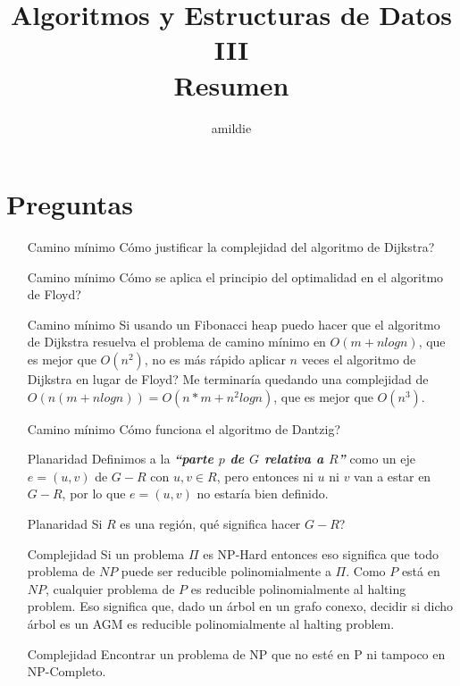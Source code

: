 \documentclass[10pt, a4paper]{article}
\title{Algoritmos y Estructuras de Datos III\\Resumen}
\author{amildie}
\date{\vspace{-5ex}}
\begin{document}
\renewcommand*\contentsname{\empty}

\maketitle
\tableofcontents















\newpage
\section{Preguntas}
\begin{enumerate}
\item [Camino m\'inimo] C\'omo justificar la complejidad del algoritmo de Dijkstra?
\item [Camino m\'inimo] C\'omo se aplica el principio del optimalidad en el algoritmo de Floyd?
\item [Camino m\'inimo] Si usando un Fibonacci heap puedo hacer que el algoritmo de Dijkstra resuelva el problema de camino m\'inimo en $O(m + n log n)$, que es mejor que $O(n^2)$, no es m\'as r\'apido aplicar $n$ veces el algoritmo de Dijkstra en lugar de Floyd? Me terminar\'ia quedando una complejidad de $O(n(m + n log n)) = $$O(n*m + n^2 log n)$, que es mejor que $O(n^3)$.
\item [Camino m\'inimo] C\'omo funciona el algoritmo de Dantzig?
\item [Planaridad] Definimos a la \textbf{\emph{``parte $p$ de $G$ relativa a $R$''}} como un eje $e = (u, v)$ de $G - R$ con $u,v \in R$, pero entonces ni $u$ ni $v$ van a estar en $G - R$, por lo que $e = (u, v)$ no estar\'ia bien definido.
\item [Planaridad] Si $R$ es una regi\'on, qu\'e significa hacer $G - R$?
\item [Complejidad] Si un problema $\Pi$ es NP-Hard entonces eso significa que todo problema de $NP$ puede ser reducible polinomialmente a $\Pi$. Como $P$ est\'a en $NP$, cualquier problema de $P$ es reducible polinomialmente al halting problem. Eso significa que, dado un \'arbol en un grafo conexo, decidir si dicho \'arbol es un AGM es reducible polinomialmente al halting problem.
\item [Complejidad] Encontrar un problema de NP que no est\'e en P ni tampoco en NP-Completo.
\end{enumerate}
\end{document}
